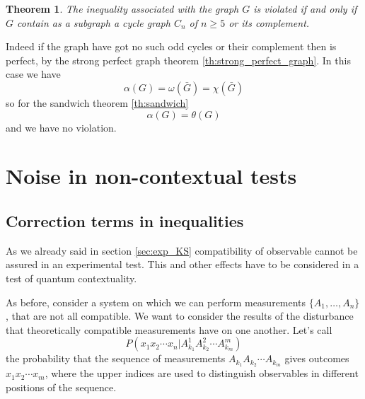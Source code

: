 \documentclass[a4paper]{article}
\newtheorem{theorem}{Theorem}[section]
\theoremstyle{definition}
\let\oldproof\proof
\let\oldendproof\endproof
\renewenvironment{proof}
    {
        \begin{framed} 
        \oldproof
    }
    {
        \oldendproof 
        \end{framed}
    }
\begin{document}
\begin{theorem}
    The inequality associated with the graph $G$ is violated if and only if $G$
    contain as a subgraph a cycle graph $C_n$ of $n\ge5$ or its complement.
    \label{th:nc_graph_indinum}
\end{theorem}
\begin{proof}
    Indeed if the graph have got no such odd cycles or their complement then is
    perfect, by the strong perfect graph theorem \ref{th:strong_perfect_graph}.
    In this case we have
    \begin{equation}
        \alpha(G) = \omega(\bar G) = \chi(\bar G)
    \end{equation}
    so for the sandwich theorem \ref{th:sandwich}
    \begin{equation}
        \alpha(G) = \theta(G)
    \end{equation}
    and we have no violation.
\end{proof}

\section{Noise in non-contextual tests}
\label{sec:noise} 

\subsection{Correction terms in inequalities}
As we already said in section \ref{sec:exp_KS} compatibility of observable
cannot be assured in an experimental test.
This and other effects have to be considered in a test of quantum contextuality.

As before, consider a system on which we can perform measurements
$\{A_1,\ldots,A_n\}$, that are not all compatible.
We want to consider the results of the disturbance that theoretically
compatible measurements have on one another.
Let's call
\begin{equation}
    P\left(x_1 x_2\cdots x_n | A_{k_1}^1 A_{k_2}^2\cdots
    A_{k_m}^m\right)
\end{equation}
the probability that the sequence of measurements $A_{k_1} A_{k_2}\cdots
A_{k_m}$ gives outcomes $x_1 x_2\cdots x_m$, where the upper indices are used to
distinguish observables in different positions of the sequence.
\end{document}
